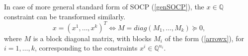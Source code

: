 \documentclass[12pt]{book}
\theoremstyle{definition}
\begin{document}



In case of more general standard form of SOCP (\ref{genSOCP}), the $x\in \mathbb{Q}$ constraint 
can be transformed similarly. 
\begin{equation*}
x = (x^1,\dots, x^k)^T \Leftrightarrow  M = diag(M_1,\dots, M_k) \succeq 0,
\end{equation*}
where $M$ is a block diagonal matrix, with blocks $M_i$ of the form (\ref{arrowx}), for $i=1,\dots, k$,
corresponding to the constraints $x^i\in \mathbb{Q}^{n_i}$.
\end{document}
